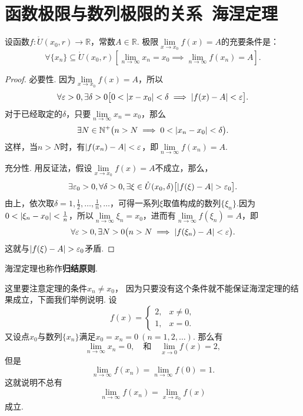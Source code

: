 \section{函数极限与数列极限的关系\ 海涅定理}
\begin{theorem}[海涅定理]\label{theorem:极限.海涅定理}
\def\Dx{\mathring{U}(x_0,r)}%
设函数\(f\colon \Dx\to\mathbb{R}\)，常数\(A\in\mathbb{R}\).
极限\(\lim\limits_{x \to x_0} f(x) = A\)的充要条件是：\[
\forall \{x_n\}\subseteq\Dx \left[
	\lim\limits_{n \to \infty} x_n = x_0
	\implies
	\lim\limits_{n \to \infty} f(x_n) = A
\right].
\]
\begin{proof}
必要性.
因为\(\lim\limits_{x \to x_0} f(x) = A\)，所以\[
\forall \varepsilon > 0, \exists \delta > 0 \bigl[
	0 < \abs{x - x_0} < \delta \implies \abs{f(x) - A} < \varepsilon
\bigr].
\]
对于已经取定的\(\delta\)，只要\(\lim\limits_{n \to \infty}x_n = x_0\)，那么\[
\exists N\in\mathbb{N}^+ \bigl(
	n > N \implies 0 < \abs{x_n - x_0} < \delta
\bigr).
\]这样，当\(n> N\)时，有\(\abs{f(x_n) - A} < \varepsilon\)，即\(\lim\limits_{n \to \infty} f(x_n) = A\).

充分性.
用反证法，假设\(\lim\limits_{x \to x_0} f(x) = A\)不成立，那么，\[
\exists \varepsilon_0 > 0, \forall \delta > 0, \exists \xi\in\mathring{U}(x_0,\delta) \bigl[
	\abs{f(\xi) - A} > \varepsilon_0
\bigr].
\]
由上，依次取\(\delta = 1,\frac{1}{2},\dotsc,\frac{1}{n},\dotsc\)，可得一系列\(\xi\)取值构成的数列\(\{\xi_n\}\).因为\(0 < \abs{\xi_n - x_0} < \frac{1}{n}\)，所以\(\lim\limits_{n \to \infty} \xi_n = x_0\)，进而有\(\lim\limits_{n \to \infty} f(\xi_n) = A\)，即\[
\forall \varepsilon > 0, \exists N > 0 \bigl(
	n > N \implies \abs{f(\xi_n) - A} < \varepsilon
\bigr).
\]这就与\(\abs{f(\xi) - A} > \varepsilon_0\)矛盾.
\end{proof}
\end{theorem}
海涅定理也称作\textbf{归结原则}.

这里要注意定理的条件\(x_n \neq x_0\)，
因为只要没有这个条件就不能保证海涅定理的结果成立，下面我们举例说明.
设\[
	f(x) = \left\{ \begin{array}{cl}
		2, & x\neq0, \\
		1, & x=0.
	\end{array} \right.
\]
又设点\(x_0\)与数列\(\{x_n\}\)满足\(x_0=x_n=0\ (n=1,2,\dotsc)\).
那么有\[
	\lim\limits_{n\to\infty} x_n = 0,
	\quad\text{和}\quad
	\lim\limits_{x\to0} f(x) = 2,
\]
但是\[
	\lim\limits_{n\to\infty} f(x_n) = \lim\limits_{n\to\infty} f(0) = 1.
\]这就说明不总有\[
	\lim\limits_{n\to\infty} f(x_n)
	= \lim\limits_{x \to x_0} f(x)
\]成立.

